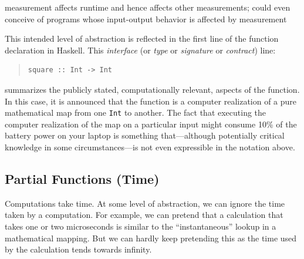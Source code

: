 \documentclass{article}
\theoremstyle{remark}
\begin{document}
measurement affects runtime and hence affects other measurements;
could even conceive of programs whose input-output behavior is
affected by measurement

This intended level of abstraction is reflected in the first
line of the function declaration in Haskell. This \emph{interface} (or \emph{type}
or \emph{signature} or \emph{contract}) line:
\begin{quote}
\begin{verbatim}
square :: Int -> Int
\end{verbatim}
\end{quote}
summarizes the publicly stated, computationally relevant, aspects of the
function. In this case, it is announced that the function is a computer
realization of a pure mathematical map from one \verb|Int| to another. The
fact that executing the computer realization of the map on a particular input
might consume 10\% of the battery power on your laptop is something
that---although potentially critical knowledge in some circumstances---is not
even expressible in the notation above. 

\subsection*{Partial Functions (Time)}

Computations take time. At some level of abstraction, we can ignore the time
taken by a computation. For example, we can pretend that a calculation that
takes one or two microseconds is similar to the ``instantaneous'' lookup in a
mathematical mapping. But we can hardly keep pretending this as the time used
by the calculation tends towards infinity.
\end{document}
